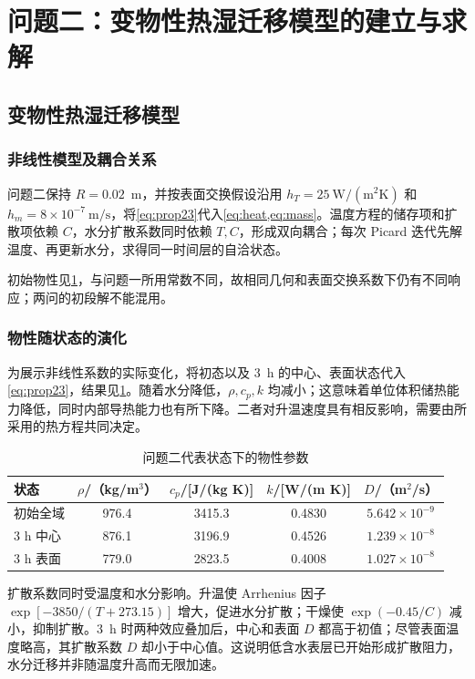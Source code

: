 \section{问题二：变物性热湿迁移模型的建立与求解}

\subsection{变物性热湿迁移模型}

\subsubsection{非线性模型及耦合关系}

问题二保持 $R=0.02$~m，并按表面交换假设沿用 $h_T=25~\mathrm{W/(m^2K)}$ 和 $h_m=8\times10^{-7}~\mathrm{m/s}$，将\cref{eq:prop23}代入\cref{eq:heat,eq:mass}。温度方程的储存项和扩散项依赖 $C$，水分扩散系数同时依赖 $T,C$，形成双向耦合；每次 Picard 迭代先解温度、再更新水分，求得同一时间层的自洽状态。

初始物性见\cref{tab:q2prop}，与问题一所用常数不同，故相同几何和表面交换系数下仍有不同响应；两问的初段解不能混用。

\subsubsection{物性随状态的演化}

为展示非线性系数的实际变化，将初态以及 3~h 的中心、表面状态代入\cref{eq:prop23}，结果见\cref{tab:q2prop}。随着水分降低，$\rho,c_p,k$ 均减小；这意味着单位体积储热能力降低，同时内部导热能力也有所下降。二者对升温速度具有相反影响，需要由所采用的热方程共同决定。

\begin{table}[!htbp]
\centering
\caption{问题二代表状态下的物性参数}\label{tab:q2prop}
\begin{tabular}{lcccc}
\toprule
状态 & $\rho$/（kg/m$^3$） & $c_p$/[J/(kg K)] & $k$/[W/(m K)] & $D$/（m$^2$/s）\\
\midrule
初始全域&976.4&3415.3&0.4830&$5.642\times10^{-9}$\\
3 h 中心&876.1&3196.9&0.4526&$1.239\times10^{-8}$\\
3 h 表面&779.0&2823.5&0.4008&$1.027\times10^{-8}$\\
\bottomrule
\end{tabular}
\end{table}

扩散系数同时受温度和水分影响。升温使 Arrhenius 因子 $\exp[-3850/(T+273.15)]$ 增大，促进水分扩散；干燥使 $\exp(-0.45/C)$ 减小，抑制扩散。3~h 时两种效应叠加后，中心和表面 $D$ 都高于初值；尽管表面温度略高，其扩散系数 $D$ 却小于中心值。这说明低含水表层已开始形成扩散阻力，水分迁移并非随温度升高而无限加速。

